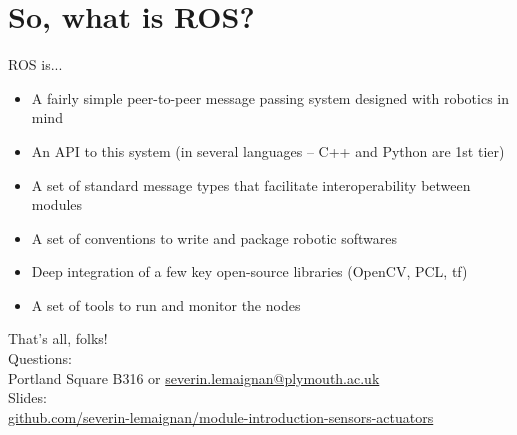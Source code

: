 \documentclass[compress]{beamer}
\begin{document}


\section{So, what is ROS?}

\begin{frame}{ROS is...}
    \begin{itemize}
        \item<+-> A fairly simple peer-to-peer message passing system designed with robotics in
            mind
        \item<+-> An API to this system (in several languages -- C++ and Python are
            1st tier)
        \item<+-> A set of standard message types that facilitate interoperability between modules
        \item<+-> A set of conventions to write and package robotic softwares
        \item<+-> Deep integration of a few key open-source libraries (OpenCV, PCL, tf)
        \item<+-> A set of tools to run and monitor the nodes
    \end{itemize}
\end{frame}


\begin{frame}{}
    \begin{center}
        \Large
        That's all, folks!\\[2em]
        \normalsize
        Questions:\\
        Portland Square B316 or \url{severin.lemaignan@plymouth.ac.uk} \\[1em]

        Slides:\\
        \href{https://github.com/severin-lemaignan/module-introduction-sensors-actuators}{\small
        github.com/severin-lemaignan/module-introduction-sensors-actuators}


    \end{center}
\end{frame}
\end{document}
